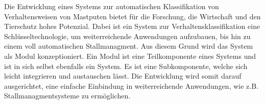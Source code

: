 Die Entwicklung eines Systems zur automatischen Klassifikation von Verhaltensweisen von Mastputen bietet für die Forschung, die Wirtschaft und den Tierschutz hohes Potenzial. Dabei ist ein System zur Verhaltensklassifikation eine Schlüsseltechnologie, um weiterreichende Anwendungen aufzubauen, bis hin zu einem voll automatischen Stallmanagment. Aus diesem Grund wird das System als Modul konzeptioniert. Ein Modul ist eine Teilkomponente eines Systems und ist in sich selbst ebenfalls ein \gls{System}. Es ist eine Subkomponente, welche sich leicht integrieren und austauschen lässt. Die Entwicklung wird somit darauf ausgerichtet, eine einfache Einbindung in weiterreichende Anwendungen, wie z.B. Stallmanagmentsysteme zu ermöglichen. 